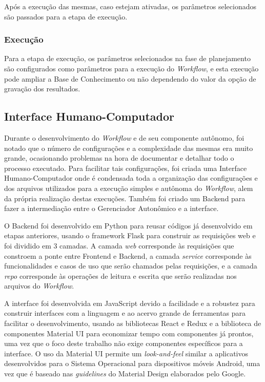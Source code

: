 \documentclass[portugues]{ic-tese}
\begin{document}
Após a execução das mesmas, caso estejam ativadas, os parâmetros selecionados são passados para a etapa de execução.

\subsubsection{Execução}

Para a etapa de execução, os parâmetros selecionados na fase de planejamento são configurados como parâmetros para a execução do \textit{Workflow}, e esta execução pode ampliar a Base de Conhecimento ou não dependendo do valor da opção de gravação dos resultados.

\subsection{Interface Humano-Computador}

Durante o desenvolvimento do \textit{Workflow} e de seu componente autônomo, foi notado que o número de configurações e a complexidade das mesmas era muito grande, ocasionando problemas na hora de documentar e detalhar todo o processo executado. Para facilitar tais configurações, foi criada uma Interface Humano-Computador onde é condensada toda a organização das configurações e dos arquivos utilizados para a execução simples e autônoma do \textit{Workflow}, alem da própria realização destas execuções. Também foi criado um Backend para fazer a intermediação entre o Gerenciador Autonômico e a interface.

O Backend foi desenvolvido em Python para reusar códigos já desenvolvido em etapas anteriores, usando o framework Flask para construir as requisições web e foi dividido em 3 camadas. A camada \textit{web} corresponde às requisições que constroem a ponte entre Frontend e Backend, a camada \textit{service} corresponde às funcionalidades e casos de uso que serão chamados pelas requisições, e a camada \textit{repo} corresponde às operações de leitura e escrita que serão realizadas nos arquivos do \textit{Workflow}.

A interface foi desenvolvida em JavaScript devido a facilidade e a robustez para construir interfaces com a linguagem e ao acervo grande de ferramentas para facilitar o desenvolvimento, usando as bibliotecas React e Redux e a biblioteca de componentes Material UI para economizar tempo com componentes já prontos, uma vez que o foco deste trabalho não exige componentes específicos para a interface. O uso da Material UI permite um \textit{look-and-feel} similar a aplicativos desenvolvidos para o Sistema Operacional para dispositivos móveis Android, uma vez que é baseado nas \textit{guidelines} do Material Design elaborados pelo Google.
\end{document}
